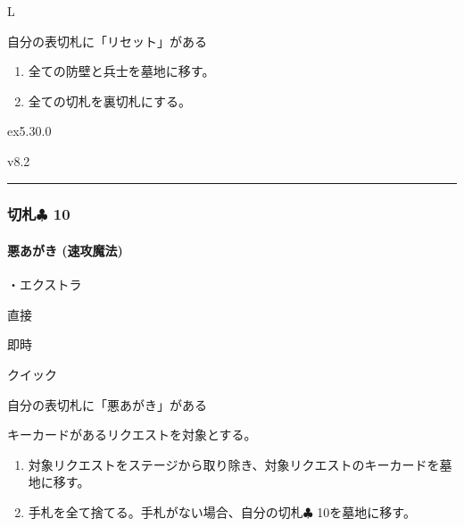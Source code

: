 \documentclass[letterpaper,10pt,dvipdfmx]{sphinxmanual}
\begin{document}
\sphinxAtStartPar
{} L

\sphinxAtStartPar
{}

\sphinxAtStartPar
自分の表切札に「リセット」がある

\sphinxAtStartPar
{}
\begin{enumerate}
%
\item {} 
\sphinxAtStartPar
全ての防壁と兵士を墓地に移す。

\item {} 
\sphinxAtStartPar
全ての切札を裏切札にする。

\end{enumerate}

\sphinxAtStartPar
{}  ex5.30.0

\sphinxAtStartPar
{}  v8.2


\bigskip\hrule\bigskip



\subsubsection{切札{\normalsize $\clubsuit$} 10}
\label{\detokenize{auto/frameActionlist:id81}}

\paragraph{悪あがき (速攻魔法)}
\label{\detokenize{auto/frameActionlist:act-lastditch}}\label{\detokenize{auto/frameActionlist:id82}}
\sphinxAtStartPar
{}

\sphinxAtStartPar
・エクストラ

\sphinxAtStartPar
{} 直接

\sphinxAtStartPar
{} 即時

\sphinxAtStartPar
{} クイック

\sphinxAtStartPar
{}

\sphinxAtStartPar
自分の表切札に「悪あがき」がある

\sphinxAtStartPar
{}

\sphinxAtStartPar
キーカードがあるリクエストを対象とする。

\sphinxAtStartPar
{}
\begin{enumerate}
%
\item {} 
\sphinxAtStartPar
対象リクエストをステージから取り除き、対象リクエストのキーカードを墓地に移す。

\item {} 
\sphinxAtStartPar
手札を全て捨てる。手札がない場合、自分の切札{\normalsize $\clubsuit$} 10を墓地に移す。

\end{enumerate}
\end{document}
